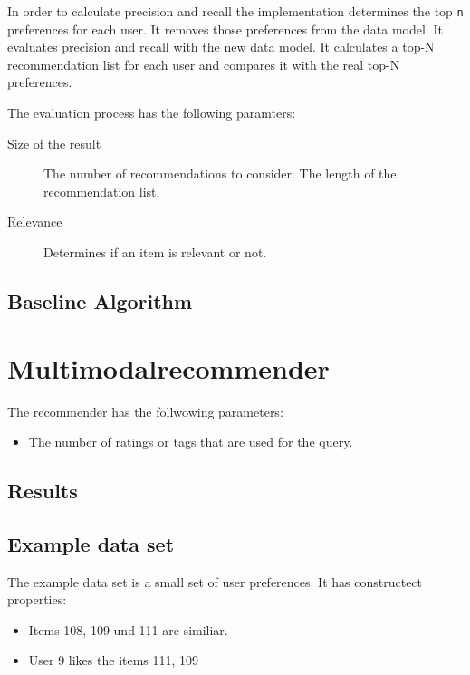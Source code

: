 \documentclass[twoside,a4paper]{article}
\begin{document}
In order to calculate precision and recall the implementation determines the top \verb|n| preferences for each user. It removes those preferences from the data model. It evaluates precision and recall with the new data model. It calculates a top-N recommendation list for each user and compares it with the real top-N preferences.

The evaluation process has the following paramters:
\begin{description}
\item[Size of the result] The number of recommendations to consider. The length of the recommendation list.
\item[Relevance] Determines if an item is relevant or not.
\end{description}


\subsection{Baseline Algorithm}
\label{sec:baselinealgorithm}


\section{Multimodalrecommender}
\label{sec:multimodalrecommender}

The recommender has the follwowing parameters:
\begin{itemize}
\item The number of ratings or tags that are used for the query.
\end{itemize}

\subsection{Results}
\label{sec:results}


\subsection{Example data set}
\label{sec:exampledataset}

The example data set is a small set of user preferences. It has constructect properties:
\begin{itemize}
\item Items 108, 109 und 111 are similiar.
\item User 9 likes the items 111, 109 

\end{itemize}
\end{document}
